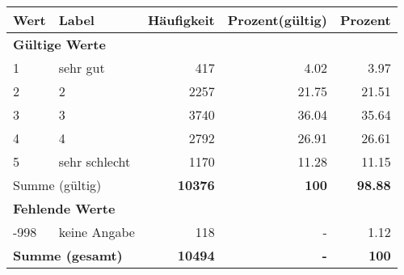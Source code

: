      \begin{longtable}{lXrrr}
     \toprule
     \textbf{Wert} & \textbf{Label} & \textbf{Häufigkeit} & \textbf{Prozent(gültig)} & \textbf{Prozent} \\
     \endhead
     \midrule
     \multicolumn{5}{l}{\textbf{Gültige Werte}}\\

     1 &
     \multicolumn{1}{X}{ sehr gut   } &


       \num{417} &
       \num[round-mode=places,round-precision=2]{4,02} &
         \num[round-mode=places,round-precision=2]{3,97} \\

     2 &
     \multicolumn{1}{X}{ 2   } &


       \num{2257} &
       \num[round-mode=places,round-precision=2]{21,75} &
         \num[round-mode=places,round-precision=2]{21,51} \\

     3 &
     \multicolumn{1}{X}{ 3   } &


       \num{3740} &
       \num[round-mode=places,round-precision=2]{36,04} &
         \num[round-mode=places,round-precision=2]{35,64} \\

     4 &
     \multicolumn{1}{X}{ 4   } &


       \num{2792} &
       \num[round-mode=places,round-precision=2]{26,91} &
         \num[round-mode=places,round-precision=2]{26,61} \\

     5 &
     \multicolumn{1}{X}{ sehr schlecht   } &


       \num{1170} &
       \num[round-mode=places,round-precision=2]{11,28} &
         \num[round-mode=places,round-precision=2]{11,15} \\
     \midrule
     \multicolumn{2}{l}{Summe (gültig)} &
       \textbf{\num{10376}} &
     \textbf{100} &
       \textbf{\num[round-mode=places,round-precision=2]{98,88}} \\
     \multicolumn{5}{l}{\textbf{Fehlende Werte}}\\
       -998 &
       keine Angabe &
         \num{118} &
        - &
         \num[round-mode=places,round-precision=2]{1,12} \\
     \midrule
     \multicolumn{2}{l}{\textbf{Summe (gesamt)}} &
          \textbf{\num{10494}} &
        \textbf{-} &
        \textbf{100} \\
     \bottomrule
     \end{longtable}
     
